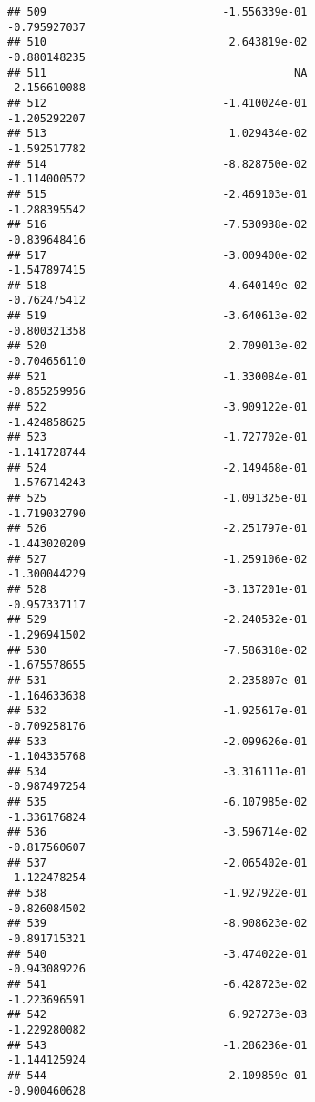 \documentclass[
]{article}
\begin{document}
\begin{verbatim}
## 509                           -1.556339e-01               -0.795927037
## 510                            2.643819e-02               -0.880148235
## 511                                      NA               -2.156610088
## 512                           -1.410024e-01               -1.205292207
## 513                            1.029434e-02               -1.592517782
## 514                           -8.828750e-02               -1.114000572
## 515                           -2.469103e-01               -1.288395542
## 516                           -7.530938e-02               -0.839648416
## 517                           -3.009400e-02               -1.547897415
## 518                           -4.640149e-02               -0.762475412
## 519                           -3.640613e-02               -0.800321358
## 520                            2.709013e-02               -0.704656110
## 521                           -1.330084e-01               -0.855259956
## 522                           -3.909122e-01               -1.424858625
## 523                           -1.727702e-01               -1.141728744
## 524                           -2.149468e-01               -1.576714243
## 525                           -1.091325e-01               -1.719032790
## 526                           -2.251797e-01               -1.443020209
## 527                           -1.259106e-02               -1.300044229
## 528                           -3.137201e-01               -0.957337117
## 529                           -2.240532e-01               -1.296941502
## 530                           -7.586318e-02               -1.675578655
## 531                           -2.235807e-01               -1.164633638
## 532                           -1.925617e-01               -0.709258176
## 533                           -2.099626e-01               -1.104335768
## 534                           -3.316111e-01               -0.987497254
## 535                           -6.107985e-02               -1.336176824
## 536                           -3.596714e-02               -0.817560607
## 537                           -2.065402e-01               -1.122478254
## 538                           -1.927922e-01               -0.826084502
## 539                           -8.908623e-02               -0.891715321
## 540                           -3.474022e-01               -0.943089226
## 541                           -6.428723e-02               -1.223696591
## 542                            6.927273e-03               -1.229280082
## 543                           -1.286236e-01               -1.144125924
## 544                           -2.109859e-01               -0.900460628

\end{verbatim}
\end{document}

